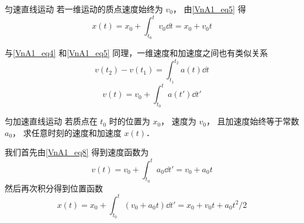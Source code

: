 \begin{exam}{匀速直线运动}
若一维运动的质点速度始终为 $v_0$， 由\autoref{VnA1_eq5} 得
\begin{equation}
x(t) = x_0 + \int_{t_0}^t v_0 \dd{t} = x_0 + v_0 t
\end{equation}
\end{exam}

与\autoref{VnA1_eq4} 和\autoref{VnA1_eq5} 同理，一维速度和加速度之间也有类似关系
\begin{equation}
v(t_2) - v(t_1) = \int_{t_1}^{t_2} a(t) \dd{t}
\end{equation}
\begin{equation}\label{VnA1_eq8}
v(t) = v_0 + \int_{t_0}^t a(t') \dd{t'}
\end{equation}

\begin{exam}{匀加速直线运动}
若质点在 $t_0$ 时的位置为 $x_0$， 速度为 $v_0$， 且加速度始终等于常数 $a_0$， 求任意时刻的速度和加速度 $x(t)$．

我们首先由\autoref{VnA1_eq8} 得到速度函数为
\begin{equation}
v(t) = v_0 + \int_{t_0}^t a_0 \dd{t'} = v_0 + a_0 t
\end{equation}
然后再次积分得到位置函数
\begin{equation}
x(t) = x_0 + \int_{t_0}^t (v_0 + a_0 t) \dd{t'} = x_0 + v_0 t + a_0 t^2/2
\end{equation}
\end{exam}